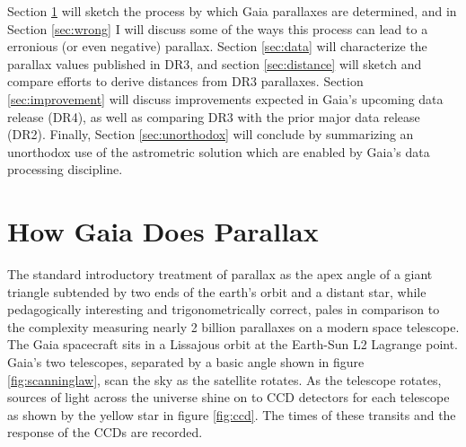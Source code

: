 \documentclass[twocolumn]{aastex631}
\begin{document}
Section \ref{sec:parallax} will sketch the process by which Gaia parallaxes are determined, and in Section \ref{sec:wrong} I will discuss some of the ways this process can lead to a erronious (or even negative) parallax.
Section \ref{sec:data} will characterize the parallax values published in DR3, and section \ref{sec:distance} will sketch and compare efforts to derive distances from DR3 parallaxes. Section \ref{sec:improvement} will discuss improvements expected in Gaia's upcoming data release (DR4), as well as comparing DR3 with the prior major data release (DR2). Finally, Section \ref{sec:unorthodox} will conclude by summarizing an unorthodox use of the astrometric solution which are enabled by Gaia's data processing discipline.

\section{How Gaia Does Parallax} \label{sec:parallax}

The standard introductory treatment of parallax as the apex angle of a giant triangle subtended by two ends of the earth's orbit and a distant star, while pedagogically interesting and trigonometrically correct, pales in comparison to the complexity measuring nearly 2 billion parallaxes on a modern space telescope. The Gaia spacecraft sits in a Lissajous orbit at the Earth-Sun L2 Lagrange point. Gaia's two telescopes, separated by a basic angle shown in figure \ref{fig:scanninglaw}, scan the sky as the satellite rotates. As the telescope rotates, sources of light across the universe shine on to CCD detectors for each telescope as shown by the yellow star in figure \ref{fig:ccd}. The times of these transits and the response of the CCDs are recorded.
\end{document}
